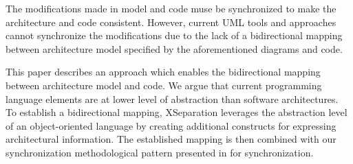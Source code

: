 \begin{comment}
In MDE tools, the regeneration of code from the changed architecture would overwrite the modifications made by programmers in code. 
Some tools such as Eclipse Modeling Framework (EMF) \cite{steinberg2008emf} separate code areas, which could be modified by the programmers, to preserve the code changes by using some specialized comments such as \ttt{@generated NOT}.
However, current separation mechanisms require the programmers to be very highly discipline.
Furthermore, even so, accidental changes are still possible \cite{zheng2012enhancing}.
The \ttt{1.x-way architecture mapping deep separation} approach \cite{zheng2012enhancing} overcome the limitations of these separation mechanisms by generating \ttt{architecture-prescribed code} in a class separating from user-code written in an other class.
However, deep separation does not allow to modify the architecture at the code level.
\end{comment}

The modifications made in model and code muse be synchronized to make the architecture and code consistent. 
However, current UML tools and approaches cannot synchronize the modifications due to the lack of a bidirectional mapping between architecture model specified by the aforementioned diagrams and code.

This paper describes an approach which enables the bidirectional mapping between architecture model and code. %
We argue that current programming language elements are at lower level of abstraction than software architectures.
To establish a bidirectional mapping, XSeparation leverages the abstraction level of an object-oriented language by creating additional constructs for expressing architectural information.
The established mapping is then combined with our synchronization methodological pattern presented in \cite{foster2016} for synchronization.

